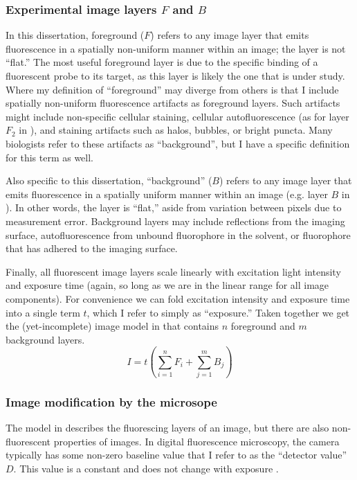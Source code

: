   
\subsubsection{Experimental image layers $F$ and $B$}


In this dissertation, foreground ($F$) refers
to any image layer that emits fluorescence in a spatially non-uniform manner
within an image; the layer is not ``flat.''
The most useful foreground layer is due to the specific binding of a
fluorescent probe to its target, as this layer is
likely the one that is under study.
Where my definition of ``foreground'' may diverge from others
is that I include spatially non-uniform fluorescence artifacts
as foreground layers. Such artifacts might include
non-specific cellular staining, cellular autofluorescence
(as for layer $F_2$ in ), and staining artifacts
such as halos, bubbles, or bright puncta.
Many biologists refer to these artifacts
as ``background'', but I have a specific definition for this term as well.


Also specific to this dissertation, ``background'' ($B$) refers to any image
layer that emits fluorescence in a spatially uniform manner within an image
(e.g. layer $B$ in ).
In other words, the layer is ``flat,'' aside from variation between
pixels due to measurement error.
Background layers may include reflections from the imaging
surface, autofluorescence from unbound fluorophore in the solvent, or fluorophore
that has adhered to the imaging surface.


Finally, all fluorescent image layers scale linearly
with excitation light intensity and
exposure time (again, so long as we are in the
linear range for all image components).
For convenience
we can fold excitation intensity and exposure time into a single term $t$, 
which I refer to simply as ``exposure.'' 
Taken together we get the (yet-incomplete)
image model in  that contains $n$ foreground
and $m$ background layers.
%
\begin{equation} \label{eq:imaging:simpleModel}
I = t \left( \sum_{i=1}^n F_i + \sum_{j=1}^m B_j \right)
\end{equation}


\subsubsection{Image modification by the microsope}

The model in  describes the fluorescing
layers of an image, but there are also non-fluorescent properties
of images.
In digital fluorescence microscopy, the camera typically has some
non-zero baseline value that I refer to as the ``detector value'' $D$.
This value is a constant and does not change with
exposure \cite{Goldman2005}.


